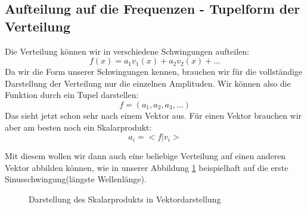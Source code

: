 \subsection{Aufteilung auf die Frequenzen - Tupelform der Verteilung}
Die Verteilung können wir in verschiedene Schwingungen aufteilen:
\begin{equation}
	f(x) = a_1 v_1(x) + a_2 v_2(x) + \dots
\end{equation}
Da wir die Form unserer Schwingungen kennen, brauchen wir für die vollständige Darstellung der Verteilung nur die einzelnen Amplituden. Wir können also die Funktion durch ein Tupel darstellen:
\begin{equation}
	f = \left(a_1, a_2, a_3, \dots \right)
\end{equation}
Das sieht jetzt schon sehr nach einem Vektor aus. Für einen Vektor brauchen wir aber am besten noch ein Skalarprodukt:
\begin{equation}
	a_i = < f | v_i > 
\end{equation}

Mit diesem wollen wir dann auch eine beliebige Verteilung auf einen anderen Vektor abbilden können, wie in unserer Abbildung \ref{fig:vektorprodukt} beispielhaft auf die erste Sinusschwingung(längste Wellenlänge).
\begin{figure}[H]
	\begin{center}
	\end{center}
	\caption{Darstellung des Skalarprodukts in Vektordarstellung}\label{fig:vektorprodukt}
\end{figure}


